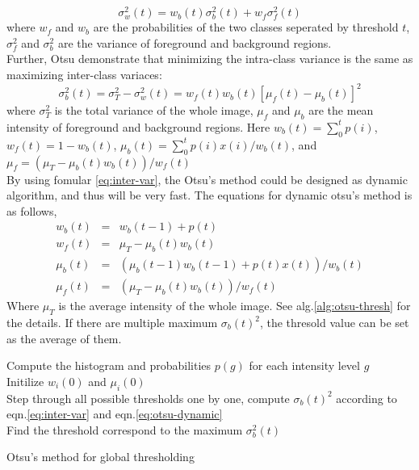\begin{equation} \label{eq:intra-var}
\sigma_w^2(t) = w_b(t)\sigma_b^2(t) + w_f\sigma_f^2(t)
\end{equation}
where $w_f$ and $w_b$ are the probabilities of the two classes seperated by threshold $t$, $\sigma_f^2$ and $\sigma_b^2$ are the variance of foreground and background regions.\\
Further, Otsu demonstrate that minimizing the intra-class variance is the same as maximizing inter-class variaces:
\begin{equation} \label{eq:inter-var}
\sigma_b^2(t) = \sigma_T^2 - \sigma_w^2(t) = w_f(t)w_b(t)[\mu_f(t) - \mu_b(t)]^2
\end{equation}
where $\sigma_T^2$ is the total variance of the whole image, $\mu_f$ and $\mu_b$ are the mean intensity of foreground and background regions. Here $w_b(t) = \sum_0^tp(i)$, $w_f(t) = 1 - w_b(t)$, $\mu_b(t) = \sum_0^tp(i)x(i)/w_b(t)$, and $\mu_f = (\mu_T - \mu_b(t)w_b(t))/w_f(t)$\\
By using fomular \ref{eq:inter-var}, the Otsu's method could be designed as dynamic algorithm, and thus will be very fast. The equations for dynamic otsu's method is as follows, 
\begin{equation} \label{eq:otsu-dynamic}
\begin{array}{lll}
	w_b(t) & = & w_b(t-1) + p(t) \\
	w_f(t) & = & \mu_T - \mu_b(t)w_b(t) \\
	\mu_b(t) & = & (\mu_b(t-1)w_b(t-1) + p(t)x(t))/w_b(t)\\
	\mu_f(t) & = & (\mu_T - \mu_b(t)w_b(t))/w_f(t)
\end{array}
\end{equation}
Where $\mu_T$ is the average intensity of the whole image. See alg.\ref{alg:otsu-thresh} for the details. If there are multiple maximum $\sigma_b(t)^2$, the thresold value can be set as the average of them.
\begin{algorithm}
\SetAlgoLined
{}
Compute the histogram and probabilities $p(g)$ for each intensity level $g$\\
Initilize $w_i(0)$ and $\mu_i(0)$\\
Step through all possible thresholds one by one, compute $\sigma_b(t)^2$ according to eqn.\ref{eq:inter-var} and eqn.\ref{eq:otsu-dynamic}\\
Find the threshold correspond to the maximum $\sigma_b^2(t)$
\caption{Otsu's method for global thresholding}
\label{alg:otsu-thresh}
\end{algorithm}
